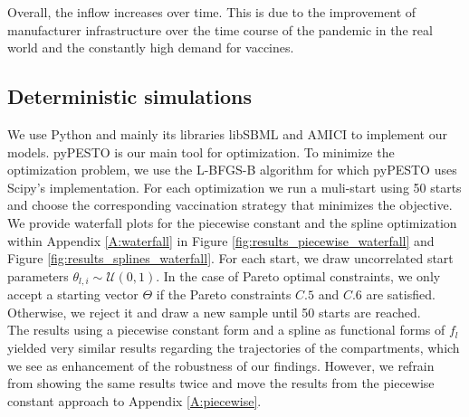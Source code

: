 Overall, the inflow increases over time. This is due to the improvement of manufacturer infrastructure over the time course of the pandemic in the real world and the constantly high demand for vaccines.


\subsection{Deterministic simulations}
We use Python and mainly its libraries libSBML \citep{Bornstein.2008} and AMICI \citep{Frohlich.2021} to implement our models. pyPESTO \citep{pyPESTO} is our main tool for optimization. To minimize the optimization problem, we use the L-BFGS-B algorithm \citep{Zhu.1997} for which pyPESTO uses Scipy's \citep{scipy.2020} implementation. For each optimization we run a muli-start using 50 starts and choose the corresponding vaccination strategy that minimizes the objective. We provide waterfall plots for the piecewise constant and the spline optimization within Appendix \ref{A:waterfall} in Figure \ref{fig:results_piecewise_waterfall} and Figure \ref{fig:results_splines_waterfall}. For each start, we draw uncorrelated start parameters $\theta_{l,i} \sim \mathcal{U}(0,1)$. In the case of Pareto optimal constraints, we only accept a starting vector $\Theta$ if the Pareto constraints $C.5$ and $C.6$ are satisfied. Otherwise, we reject it and draw a new sample until 50 starts are reached.\\

The results using a piecewise constant form and a spline as functional forms of $f_l$ yielded very similar results regarding the trajectories of the compartments, which we see as enhancement of the robustness of our findings. However, we refrain from showing the same results twice and move the results from the piecewise constant approach to Appendix \ref{A:piecewise}.  \\

